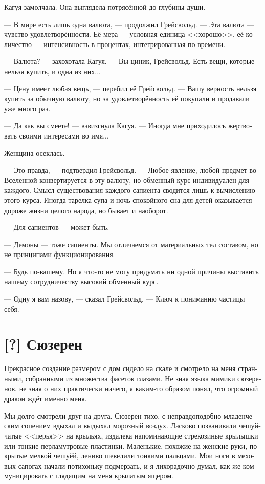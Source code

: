 \documentclass[a4paper,12pt,fleqn]{book}\usepackage{cooltooltips}\usepackage{polyglossia}\setdefaultlanguage[babelshorthands=true]{russian}\setotherlanguage{english}\defaultfontfeatures{Ligatures=TeX,Mapping=tex-text} \usepackage{xcolor}\definecolor{lightgray}{HTML}{bbbbbb}\color{lightgray}\newcommand{\ml}[3]{\textenglish{\textcolor{black}{#3}}}
\newcommand{\textspace}{\vspace{1em}{\centering\Large\bfseries<...>\par}\vspace{1em}}
\begin{document}
Кагуя замолчала.
Она выглядела потрясённой до глубины души.

--- В мире есть лишь одна валюта, --- продолжил Грейсвольд.
--- Эта валюта --- чувство удовлетворённости.
Её мера --- условная единица <<хорошо>>, её количество --- интенсивность в процентах, интегрированная по времени.

--- Валюта? --- захохотала Кагуя.
--- Вы циник, Грейсвольд.
Есть вещи, которые нельзя купить, и одна из них...

--- Цену имеет любая вещь, --- перебил её Грейсвольд.
--- Вашу верность нельзя купить за обычную валюту, но за удовлетворённость её покупали и продавали уже много раз.

--- Да как вы смеете! --- взвизгнула Кагуя.
--- Иногда мне приходилось жертвовать своими интересами во имя...

Женщина осеклась.

--- Это правда, --- подтвердил Грейсвольд.
--- Любое явление, любой предмет во Вселенной конвертируется в эту валюту, но обменный курс индивидуален для каждого.
Смысл существования каждого сапиента сводится лишь к вычислению этого курса.
Иногда тарелка супа и ночь спокойного сна для детей оказывается дороже жизни целого народа, но бывает и наоборот.

--- Для сапиентов --- может быть.

--- Демоны --- тоже сапиенты.
Мы отличаемся от материальных тел составом, но не принципами функционирования.

--- Будь по-вашему.
Но я что-то не могу придумать ни одной причины выставить нашему сотрудничеству высокий обменный курс.

--- Одну я вам назову, --- сказал Грейсвольд.
--- Ключ к пониманию частицы себя.

\textspace

\section{[?] Сюзерен}

\textspace

Прекрасное создание размером с дом сидело на скале и смотрело на меня странными, собранными из множества фасеток глазами.
Не зная языка мимики сюзеренов, не зная о них практически ничего, я каким-то образом понял, что огромный дракон ждёт именно меня.

Мы долго смотрели друг на друга.
Сюзерен тихо, с неправдоподобно младенческим сопением вдыхал и выдыхал морозный воздух.
Ласково позванивали чешуйчатые <<перья>> на крыльях, издалека напоминающие стрекозиные крылышки или тонкие перламутровые пластинки.
Маленькие, похожие на женские руки, покрытые мелкой чешуёй, лениво шевелили тонкими пальцами.
Мои ноги в меховых сапогах начали потихоньку подмерзать, и я лихорадочно думал, как же коммуницировать с глядящим на меня крылатым ящером.
\end{document}
